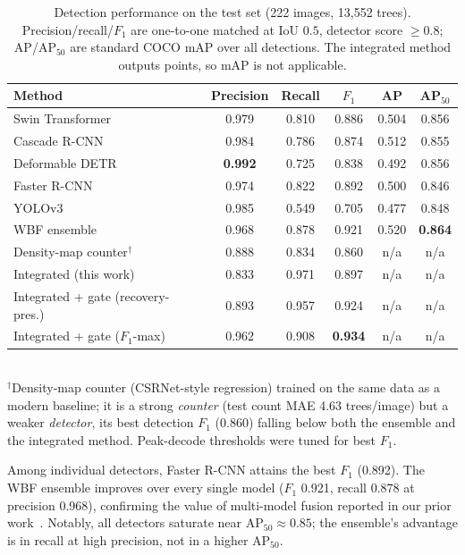 \begin{table}[htbp]
\centering
\caption{Detection performance on the test set (222 images, 13{,}552 trees).
Precision/recall/$F_1$ are one-to-one matched at IoU $0.5$, detector score
$\geq 0.8$; AP/AP$_{50}$ are standard COCO mAP over all detections. The
integrated method outputs points, so mAP is not applicable.}
\label{tab:results}
\begin{tabular}{lccccc}
\toprule
Method & Precision & Recall & $F_1$ & AP & AP$_{50}$ \\
\midrule
Swin Transformer   & 0.979 & 0.810 & 0.886 & 0.504 & 0.856 \\
Cascade R-CNN      & 0.984 & 0.786 & 0.874 & 0.512 & 0.855 \\
Deformable DETR    & \textbf{0.992} & 0.725 & 0.838 & 0.492 & 0.856 \\
Faster R-CNN       & 0.974 & 0.822 & 0.892 & 0.500 & 0.846 \\
YOLOv3             & 0.985 & 0.549 & 0.705 & 0.477 & 0.848 \\
WBF ensemble       & 0.968 & 0.878 & 0.921 & 0.520 & \textbf{0.864} \\
\midrule
Density-map counter$^\dagger$ & 0.888 & 0.834 & 0.860 & n/a & n/a \\
\midrule
Integrated (this work)                & 0.833 & 0.971 & 0.897 & n/a & n/a \\
Integrated + gate (recovery-pres.)    & 0.893 & 0.957 & 0.924 & n/a & n/a \\
Integrated + gate ($F_1$-max)         & 0.962 & 0.908 & \textbf{0.934} & n/a & n/a \\
\bottomrule
\end{tabular}\\[2pt]
{\footnotesize $^\dagger$Density-map counter (CSRNet-style regression) trained on
the same data as a modern baseline; it is a strong \emph{counter} (test count
MAE 4.63 trees/image) but a weaker \emph{detector}, its best detection $F_1$
(0.860) falling below both the ensemble and the integrated method. Peak-decode
thresholds were tuned for best $F_1$.}
\end{table}

Among individual detectors, Faster R-CNN attains the best $F_1$ (0.892). The WBF
ensemble improves over every single model ($F_1$ 0.921, recall 0.878 at
precision 0.968), confirming the value of multi-model fusion reported in our
prior work~\cite{durgut2025multi}. Notably, all detectors saturate near
AP$_{50}\approx 0.85$; the ensemble's advantage is in recall at high precision,
not in a higher AP$_{50}$.

